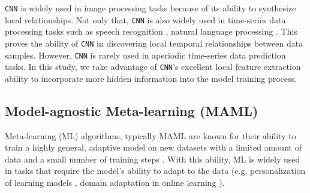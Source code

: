 \documentclass[aps,prb,groupedaddress,twocolumn,showpacs,dvipdfmx,superscriptaddress,pdftex]{revtex4-2}
\begin{document}
\verb|CNN| is widely used in image processing tasks \citep{naranjo2020review, sharma2018analysis} because of its ability to synthesize local relationships. Not only that, \verb|CNN| is also widely used in time-series data processing tasks such as speech recognition \cite{dua2022developing}, natural language processing \cite{varshitha2023natural}. This proves the ability of \verb|CNN| in discovering local temporal relationships between data samples. However, \verb|CNN| is rarely used in aperiodic time-series data prediction tasks. In this study, we take advantage of \verb|CNN|'s excellent local feature extraction ability to incorporate more hidden information into the model training process.

\subsection{Model-agnostic Meta-learning (MAML)}


Meta-learning (ML) algorithms, typically MAML \cite{finn2017model} are known for their ability to train a highly general, adaptive model on new datasets with a limited amount of data and a small number of training steps \citep{hospedales2021meta, vettoruzzo2024advances}. With this ability, ML is widely used in tasks that require the model's ability to adapt to the data (e.g. personalization of learning models \citep{chen2018federated, fallah2020personalized,nguyen2022meta}, domain adaptation in online learning \citep{hu2023meta, khoee2024domain}).

\vspace{2mm}

\end{document}
